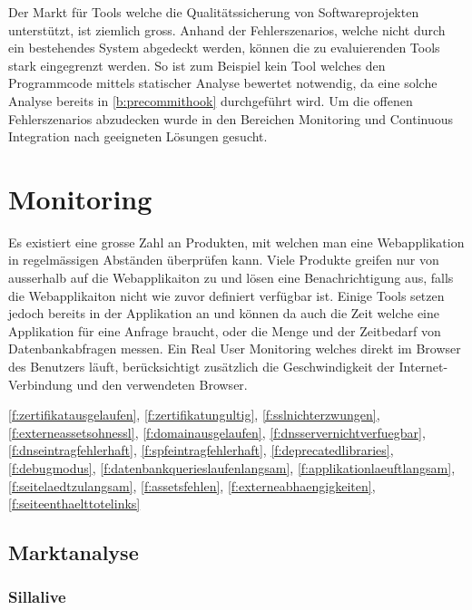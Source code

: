 
Der Markt für Tools welche die Qualitätssicherung von Softwareprojekten unterstützt, ist ziemlich gross. Anhand der Fehlerszenarios, welche nicht durch ein bestehendes System abgedeckt werden, können die zu evaluierenden Tools stark eingegrenzt werden. So ist zum Beispiel kein Tool welches den Programmcode mittels statischer Analyse bewertet notwendig, da eine solche Analyse bereits in \ref{b:precommithook} durchgeführt wird. Um die offenen Fehlerszenarios abzudecken wurde in den Bereichen Monitoring und Continuous Integration nach geeigneten Lösungen gesucht.

\section{Monitoring}
\label{sec:monitoring_evaluation}
Es existiert eine grosse Zahl an Produkten, mit welchen man eine Webapplikation in regelmässigen Abständen überprüfen kann. Viele Produkte greifen nur von ausserhalb auf die Webapplikaiton zu und lösen eine Benachrichtigung aus, falls die Webapplikaiton nicht wie zuvor definiert verfügbar ist. Einige Tools setzen jedoch bereits in der Applikation an und können da auch die Zeit welche eine Applikation für eine Anfrage braucht, oder die Menge und der Zeitbedarf von Datenbankabfragen messen. Ein Real User Monitoring welches direkt im Browser des Benutzers läuft, berücksichtigt zusätzlich die Geschwindigkeit der Internet-Verbindung und den verwendeten Browser.

\ref{f:zertifikatausgelaufen}, \ref{f:zertifikatungultig}, \ref{f:sslnichterzwungen}, \ref{f:externeassetsohnessl}, \ref{f:domainausgelaufen}, \ref{f:dnsservernichtverfuegbar}, \ref{f:dnseintragfehlerhaft}, \ref{f:spfeintragfehlerhaft}, \ref{f:deprecatedlibraries}, \ref{f:debugmodus}, \ref{f:datenbankquerieslaufenlangsam}, \ref{f:applikationlaeuftlangsam}, \ref{f:seitelaedtzulangsam}, \ref{f:assetsfehlen}, \ref{f:externeabhaengigkeiten}, \ref{f:seiteenthaelttotelinks}

\subsection{Marktanalyse}
\label{sub:marktanalyse}

\subsubsection{Sillalive}
\label{ssub:sillalive}

